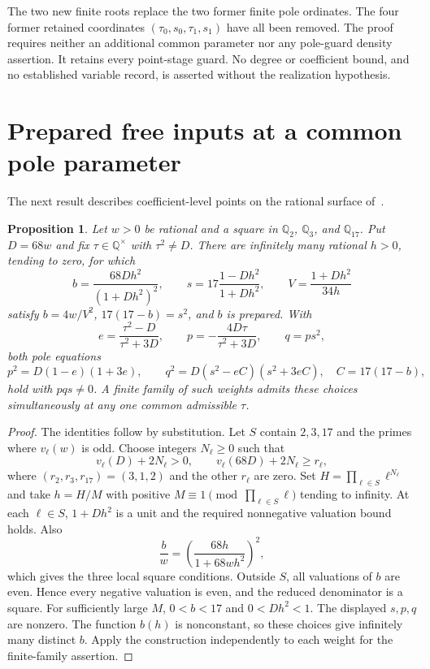 \documentclass[11pt,a4paper]{article}
\newtheorem{proposition}[theorem]{Proposition}
\theoremstyle{definition}\newtheorem{definition}[theorem]{Definition}
\newcommand{\Q}{\mathbb Q}\newcommand{\Z}{\mathbb Z}
\begin{document}
The two new finite roots replace the two former finite pole ordinates.
The four former retained coordinates $(\tau_0,s_0,\tau_1,s_1)$ have
all been removed. The proof requires neither an additional common
parameter nor any pole-guard density assertion. It retains every
point-stage guard. No degree or coefficient bound, and no established
variable record, is asserted without the realization hypothesis.

\section{Prepared free inputs at a common pole parameter}
The next result describes coefficient-level points on the rational
surface of~\cite{Quadric}.

\begin{proposition}\label{prop:preparation}
Let $w>0$ be rational and a square in $\Q_2$, $\Q_3$, and
$\Q_{17}$. Put $D=68w$ and fix $\tau\in\Q^\times$ with
$\tau^2\ne D$. There are infinitely many rational $h>0$, tending
to zero, for which
\[
b=\frac{68Dh^2}{(1+Dh^2)^2},\qquad
s=17\frac{1-Dh^2}{1+Dh^2},\qquad
V=\frac{1+Dh^2}{34h}
\]
satisfy $b=4w/V^2$, $17(17-b)=s^2$, and $b$ is prepared.
With
\[
e=\frac{\tau^2-D}{\tau^2+3D},\qquad
p=-\frac{4D\tau}{\tau^2+3D},\qquad q=ps^2,
\]
both pole equations
\[
p^2=D(1-e)(1+3e),\qquad
q^2=D(s^2-eC)(s^2+3eC),\quad C=17(17-b),
\]
hold with $pqs\ne0$. A finite family of such weights admits these
choices simultaneously at any one common admissible $\tau$.
\end{proposition}
\begin{proof}
The identities follow by substitution. Let $S$ contain $2,3,17$ and
the primes where $v_\ell(w)$ is odd. Choose integers $N_\ell\ge0$
such that
\[
v_\ell(D)+2N_\ell>0,\qquad
v_\ell(68D)+2N_\ell\ge r_\ell,
\]
where $(r_2,r_3,r_{17})=(3,1,2)$ and the other $r_\ell$ are zero.
Set $H=\prod_{\ell\in S}\ell^{N_\ell}$ and take $h=H/M$ with
positive $M\equiv1\pmod{\prod_{\ell\in S}\ell}$ tending to
infinity. At each $\ell\in S$, $1+Dh^2$ is a unit and the required
nonnegative valuation bound holds. Also
\[
\frac bw=\left(\frac{68h}{1+68wh^2}\right)^2,
\]
which gives the three local square conditions. Outside $S$, all
valuations of $b$ are even. Hence every negative valuation is even,
and the reduced denominator is a square. For sufficiently large $M$,
$0<b<17$ and $0<Dh^2<1$. The displayed $s,p,q$ are nonzero.
The function $b(h)$ is nonconstant, so these choices give infinitely
many distinct $b$. Apply the construction independently to each
weight for the finite-family assertion.
\end{proof}
\end{document}
